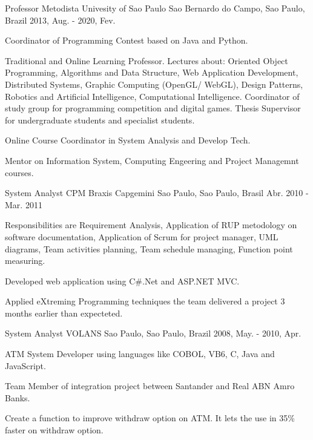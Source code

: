 \begin{cventries}
  \cventry
    {Professor} %
    {Metodista Univesity of Sao Paulo} %
    {Sao Bernardo do Campo, Sao Paulo, Brazil} %
    {2013, Aug. - 2020, Fev.} %
    {
      \begin{cvitems} %
        \item {Coordinator of Programming Contest based on Java and Python.}
        \item {Traditional and Online Learning Professor. Lectures about: Oriented Object Programming, Algorithms and Data Structure, Web Application Development, Distributed Systems, Graphic Computing (OpenGL/ WebGL), Design Patterns, Robotics and Artificial Intelligence, Computational Intelligence. Coordinator of study group for programming competition and digital games. Thesis Supervisor for undergraduate students and specialist students.}
        \item {Online Course Coordinator in System Analysis and Develop Tech.}
        \item {Mentor on Information System, Computing Engeering and Project Managemnt courses.}
      \end{cvitems}
    }

  \cventry
    {System Analyst} %
    {CPM Braxis Capgemini} %
    {Sao Paulo, Sao Paulo, Brasil} %
    {Abr. 2010 - Mar. 2011} %
    {
      \begin{cvitems} %
        \item {Responsibilities are Requirement Analysis, Application of RUP metodology on software documentation, Application of Scrum for project manager, UML diagrams, Team activities planning, Team schedule managing, Function point measuring.}
        \item {Developed web application using C\#.Net and ASP.NET MVC.}
        \item {Applied eXtreming Programming techniques the team delivered a project 3 months earlier than expecteted.}
      \end{cvitems}
    }

  \cventry
    {System Analyst} %
    {VOLANS} %
    {Sao Paulo, Sao Paulo, Brazil} %
    {2008, May. - 2010, Apr.} %
    {
      \begin{cvitems} %
        \item {ATM System Developer using languages like COBOL, VB6, C, Java and JavaScript.}
        \item {Team Member of integration project between Santander and Real ABN Amro Banks.}
        \item {Create a function to improve withdraw option on ATM. It lets the use in 35\% faster on withdraw option.}
      \end{cvitems}
    }


\end{cventries}
